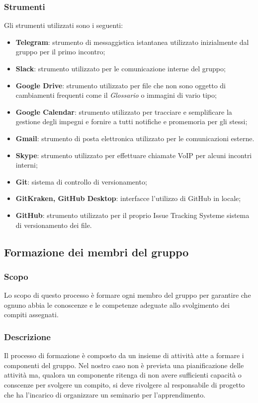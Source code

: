 		\subsubsection{Strumenti}
			Gli strumenti utilizzati sono i seguenti:
			\begin{itemize}
				\item \textbf{Telegram}\glo: strumento di messaggistica istantanea utilizzato inizialmente dal gruppo per il primo incontro;
				\item \textbf{Slack}\glo: strumento utilizzato per le comunicazione interne del gruppo;
				\item \textbf{Google Drive}: strumento utilizzato per file che non sono oggetto di cambiamenti frequenti come il \textit{Glossario} o immagini di vario tipo;
				\item \textbf{Google Calendar}: strumento utilizzato per tracciare e semplificare la gestione degli impegni e fornire a tutti notifiche e promemoria per gli stessi;
				\item \textbf{Gmail}: strumento di posta elettronica utilizzato per le comunicazioni esterne.
				\item \textbf{Skype}: strumento utilizzato per effettuare chiamate VoIP per alcuni incontri interni;
				\item \textbf{Git}: sistema di controllo di versionamento;
				\item \textbf{GitKraken, GitHub Desktop}: interfacce l'utilizzo di GitHub in locale;
				\item \textbf{GitHub}: strumento utilizzato per il proprio Issue Tracking System\glosp e sistema di versionamento dei file.
			\end{itemize}
	\subsection{Formazione dei membri del gruppo}
		\subsubsection{Scopo}
			Lo scopo di questo processo è formare ogni membro del gruppo per garantire che ognuno abbia le conoscenze e le competenze adeguate allo svolgimento dei compiti assegnati.
		\subsubsection{Descrizione}
			Il processo di formazione è composto da un insieme di attività atte a formare i componenti del gruppo. Nel nostro caso non è prevista una pianificazione delle attività ma, qualora un componente ritenga di non avere sufficienti capacità o conscenze per svolgere un compito, si deve rivolgere al responsabile di progetto che ha l'incarico di organizzare un seminario per l'apprendimento. 
